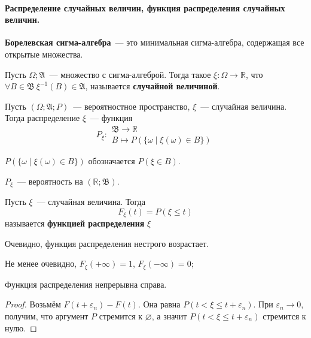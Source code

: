 \documentclass{article}
\let\eps\varepsilon
\newcommand{\A}{{\mathfrak A}}
\newcommand{\B}{{\mathfrak B}}
\begin{document}
    \paragraph{Распределение случайных величин, функция распределения случайных величин.}
    \begin{definition}
        \textbf{Борелевская сигма-алгебра}~--- это минимальная сигма-алгебра, содержащая все открытые множества.
    \end{definition}
    \begin{definition}
        Пусть $\Omega;\A$~--- множество с сигма-алгеброй. Тогда такое $\xi\colon\Omega\to\mathbb R$, что $\forall B\in\B~\xi^{-1}(B)\in\A$, называется \textbf{случайной величиной}.
    \end{definition}
    \begin{definition}
        Пусть $(\Omega;\A;P)$~--- вероятностное пространство, $\xi$~--- случайная величина. Тогда распределение $\xi$~--- функция
        $$
        P_\xi\colon\substack{\B\to\mathbb R\\B\mapsto P(\{\omega\mid \xi(\omega)\in B\})}
        $$
    \end{definition}
    \begin{remark}
        $P(\{\omega\mid \xi(\omega)\in B\})$ обозначается $P(\xi\in B)$.
    \end{remark}
    \begin{property}
        $P_\xi$~--- вероятность на $(\mathbb R;\B)$.
    \end{property}
    \begin{definition}
        Пусть $\xi$~--- случайная величина. Тогда
        $$
        F_\xi(t)=P(\xi\leqslant t)
        $$
        называется \textbf{функцией распределения} $\xi$
    \end{definition}
    \begin{property}
        Очевидно, функция распределения нестрого возрастает.
    \end{property}
    \begin{property}
        Не менее очевидно, $F_\xi(+\infty)=1$, $F_\xi(-\infty)=0$;
    \end{property}
    \begin{property}
        Функция распределения непрерывна справа.
    \end{property}
    \begin{proof}
        Возьмём $F(t+\eps_n)-F(t)$. Она равна $P(t<\xi\leqslant t+\eps_n)$. При $\eps_n\to0$, получим, что аргумент $P$ стремится к $\varnothing$, а значит $P(t<\xi\leqslant t+\eps_n)$ стремится к нулю.
    \end{proof}
\end{document}
